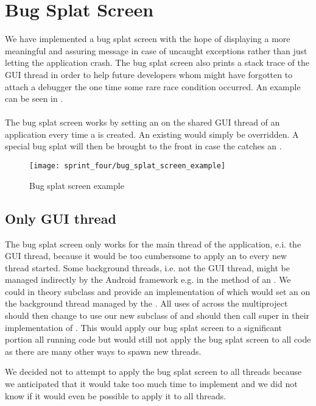 
\section{Bug Splat Screen}
\label{sec:bug_splat_screen}

We have implemented a bug splat screen with the hope of displaying a more meaningful and assuring message in case of uncaught exceptions rather than just letting the application crash. The bug splat screen also prints a stack trace of the GUI thread in order to help future developers whom might have forgotten to attach a debugger the one time some rare race condition occurred. An example can be seen in .
\\\\
The bug splat screen works by setting an  on the shared GUI thread of an application every time a  is created. An existing  would simply be overridden. A special bug splat  will then be brought to the front in case the  catches an .

\begin{figure}[!htbp]
        \centering
        \texttt{[image: sprint\_four/bug\_splat\_screen\_example]}
        \caption{Bug splat screen example}
        \label{fig:bug_splat_screen_example}
\end{figure}

\subsection{Only GUI thread} 
The bug splat screen only works for the main thread of the application, e.i. the GUI thread, because it would be too cumbersome to apply an  to every new thread started. Some background threads, i.e. not the GUI thread, might be managed indirectly by the Android framework e.g. in the  method of an . We could in theory subclass  and provide an implementation of  which would set an  on the background thread managed by the . All uses of  across the \giraf multiproject should then change to use our new subclass of  and should then call super in their implementation of . This would apply our bug splat screen to a significant portion all running code but would still not apply the bug splat screen to all code as there are many other ways to spawn new threads. 

We decided not to attempt to apply the bug splat screen to all threads because we anticipated that it would take too much time to implement and we did not know if it would even be possible to apply it to all threads.          
